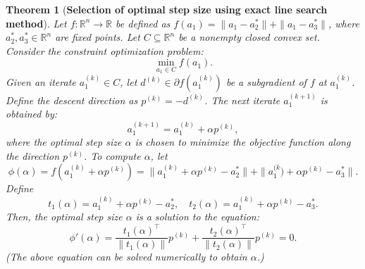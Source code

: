 \documentclass[12pt]{article}
\theoremstyle{plain}
\newtheorem{theorem}{Theorem}[section]
\theoremstyle{definition}
\begin{document}
\begin{theorem}[\textbf{Selection of optimal step size using exact line search method}]\label{exactlinesearchtheorem}
	Let $f: \mathbb{R}^n \to \mathbb{R}$ be defined as $f(a_1) = \|a_1 - a_2^*\| + \|a_1 - a_3^*\|$, where $a_2^*, a_3^* \in \mathbb{R}^n$ are fixed points. Let $C \subseteq \mathbb{R}^n$ be a nonempty closed convex set. Consider the constraint  optimization problem:
	$$
	\min_{a_1 \in C} f(a_1).
	$$
	Given an iterate $a_1^{(k)} \in C$, let $d^{(k)} \in \partial f(a_1^{(k)})$ be a subgradient of $f$ at $a_1^{(k)}$. Define the descent direction as $p^{(k)} = -d^{(k)}$. The next iterate $a_1^{(k+1)}$ is obtained by:
	$$
	a_1^{(k+1)} = a_1^{(k)} + \alpha p^{(k)},
	$$
	where the optimal step size $\alpha$ is chosen to minimize the objective function along the direction $p^{(k)}$. To compute $\alpha$, let
	$$
	\phi(\alpha) = f(a_1^{(k)} + \alpha p^{(k)}) =  \|a_1^{(k)} + \alpha p^{(k)} - a_2^*\| + \|a_1^{(k}) + \alpha p^{(k)} - a_3^*\|.
	$$
	Define 
	$$
	t_1(\alpha) = a_1^{(k)} + \alpha p^{(k)} - a_2^*, \quad t_2(\alpha) = a_1^{(k)} + \alpha p^{(k)} - a_3^*.
	$$
	Then,
	the optimal step size $\alpha$ is a solution to the equation:
	$$
	\phi'(\alpha) = \frac{t_1(\alpha)^\top}{\|t_1(\alpha)\|} p^{(k)} + \frac{t_2(\alpha)^\top}{\|t_2(\alpha)\|} p^{(k)} = 0.
	$$
	(The above equation can be solved numerically to obtain $\alpha$.)
\end{theorem}
\end{document}
